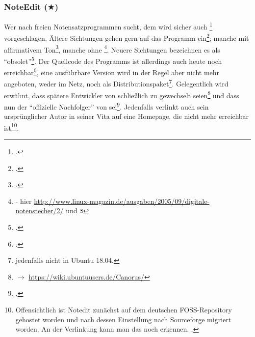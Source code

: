 %
%
%



\subsubsection{NoteEdit ($\bigstar$)}

\label{NoteEdit}Wer nach freien Notensatzprogrammen sucht, dem wird sicher auch
\footcite[vgl.][\nopage wp]{Andres2002a} vorgeschlagen. Ältere
Sichtungen gehen gern auf das Programm ein\footcite[vgl.][\nopage
wp]{Roitman2007a}; manche mit affirmativem Ton\footcite[vgl.][\nopage
wp]{LinuxSoundNotation2006a}, manche ohne
\footnote{\cite[vgl.][\nopage]{Brendel2005a} - hier
\href{http://www.linux-magazin.de/ausgaben/2005/09/digitale-notenstecher/2/}
{http://www.linux-magazin.de/ausgaben/2005/09/digitale-notenstecher/2/} und
\texttt{\/3\/}}. Neuere Sichtungen bezeichnen es als
\enquote{obsolet}\footcite[vgl.][\nopage wp]{WpedNotensatz2019a}.
Der Quellcode des Programms ist allerdings auch heute noch
erreichbar\footcite[vgl.][\nopage]{NoteeditRep2014a}, eine ausführbare Version
wird in der Regel aber nicht mehr angeboten, weder im Netz, noch als
Distri\-bu\-tions\-paket\footnote{jedenfalls nicht in Ubuntu 18.04.}. Gelegentlich wird
erwähnt, dass spätere Entwickler von  schließlich zu 
gewechselt seien\footnote{$\rightarrow$
\href{https://wiki.ubuntuusers.de/Canorus/}{https://wiki.ubuntuusers.de/Canorus/}
} und dass  nun der \enquote{offizielle Nachfolger} von
 sei\footcite[vgl.][\nopage wp]{WpedCanorus2019a}.
Jedenfalls verlinkt auch sein ursprünglicher Autor  in seiner Vita
auf eine Homepage, die nicht mehr erreichbar ist\footnote{Offensichtlich ist
Notedit zunächst auf dem deutschen FOSS-Repository  gehostet worden
und nach dessen Einstellung nach Sourceforge migriert worden. An der Verlinkung
kann man das noch erkennen. \cite[vgl. dazu][\nopage wp]{Andres2018a}.}.


